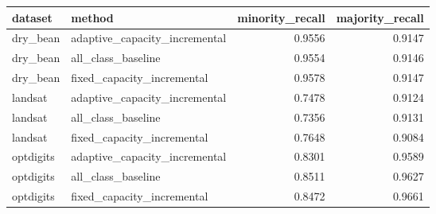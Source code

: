 \begin{tabular}{llrr}
\toprule
dataset & method & minority\_recall & majority\_recall \\
\midrule
dry\_bean & adaptive\_capacity\_incremental & 0.9556 & 0.9147 \\
dry\_bean & all\_class\_baseline & 0.9554 & 0.9146 \\
dry\_bean & fixed\_capacity\_incremental & 0.9578 & 0.9147 \\
landsat & adaptive\_capacity\_incremental & 0.7478 & 0.9124 \\
landsat & all\_class\_baseline & 0.7356 & 0.9131 \\
landsat & fixed\_capacity\_incremental & 0.7648 & 0.9084 \\
optdigits & adaptive\_capacity\_incremental & 0.8301 & 0.9589 \\
optdigits & all\_class\_baseline & 0.8511 & 0.9627 \\
optdigits & fixed\_capacity\_incremental & 0.8472 & 0.9661 \\
\bottomrule
\end{tabular}
